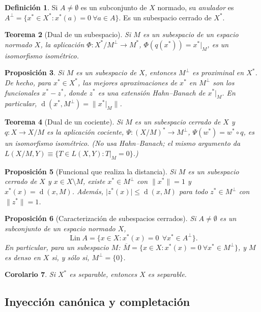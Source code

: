 \documentclass[11pt,a4paper]{article}
\newcommand{\norm}[1]{\lVert #1\rVert}
\newcommand{\abs}[1]{\lvert #1\rvert}
\newcommand{\Lin}{\operatorname{Lin}}
\newcommand{\dist}{\operatorname{d}}
\theoremstyle{plain}
\newtheorem{teorema}{Teorema}[section]
\newtheorem{proposicion}[teorema]{Proposición}
\newtheorem{corolario}[teorema]{Corolario}
\theoremstyle{definition}
\newtheorem{definicion}[teorema]{Definición}
\theoremstyle{remark}
\begin{document}
\begin{definicion}
Si $A\neq\emptyset$ es un subconjunto de $X$ normado, su \emph{anulador} es $A^\perp=\{x^*\in X^*: x^*(a)=0\ \forall a\in A\}$. Es un subespacio cerrado de $X^*$.
\end{definicion}

\begin{teorema}[Dual de un subespacio]
Si $M$ es un subespacio de un espacio normado $X$, la aplicación $\Phi:X^*/M^\perp\to M^*$, $\Phi(q(x^*))=x^*|_M$, es un isomorfismo isométrico.
\end{teorema}

\begin{proposicion}
Si $M$ es un subespacio de $X$, entonces $M^\perp$ es proximinal en $X^*$. De hecho, para $x^*\in X^*$, las mejores aproximaciones de $x^*$ en $M^\perp$ son los funcionales $x^*-z^*$, donde $z^*$ es una extensión Hahn--Banach de $x^*|_M$. En particular, $\dist(x^*,M^\perp)=\norm{x^*|_M}$.
\end{proposicion}

\begin{teorema}[Dual de un cociente]
Si $M$ es un subespacio cerrado de $X$ y $q:X\to X/M$ es la aplicación cociente, $\Psi:(X/M)^*\to M^\perp$, $\Psi(w^*)=w^*\circ q$, es un isomorfismo isométrico. (No usa Hahn--Banach; el mismo argumento da $L(X/M,Y)\equiv\{T\in L(X,Y):T|_M=0\}$.)
\end{teorema}

\begin{proposicion}[Funcional que realiza la distancia]
Si $M$ es un subespacio cerrado de $X$ y $x\in X\setminus M$, existe $x^*\in M^\perp$ con $\norm{x^*}=1$ y $x^*(x)=\dist(x,M)$. Además, $\abs{z^*(x)}\le\dist(x,M)$ para todo $z^*\in M^\perp$ con $\norm{z^*}=1$.
\end{proposicion}

\begin{proposicion}[Caracterización de subespacios cerrados]
Si $A\neq\emptyset$ es un subconjunto de un espacio normado $X$,
\[
\Lin A=\{x\in X: x^*(x)=0\ \ \forall x^*\in A^\perp\}.
\]
En particular, para un subespacio $M$: $\overline M=\{x\in X:x^*(x)=0\ \forall x^*\in M^\perp\}$, y $M$ es denso en $X$ si, y sólo si, $M^\perp=\{0\}$.
\end{proposicion}

\begin{corolario}
Si $X^*$ es separable, entonces $X$ es separable.
\end{corolario}

\subsection{Inyección canónica y completación}
\end{document}
